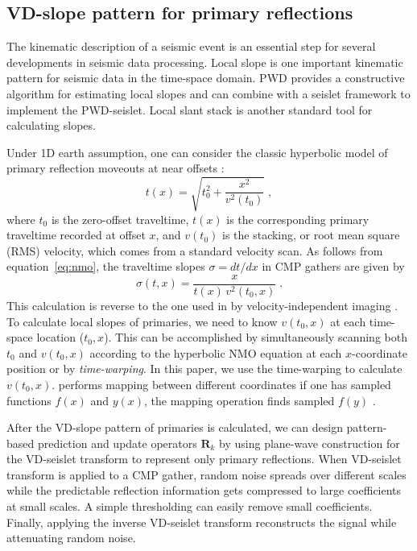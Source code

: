 \subsection{VD-slope pattern for primary reflections}
The kinematic description of a seismic event is an essential step for
several developments in seismic data processing. Local slope is
one important kinematic pattern for seismic data in the time-space
domain. PWD provides a constructive algorithm for estimating local slopes
\cite[]{Claerbout92,Fomel02,Schleicher09,Chen13a,Chen13b} and can 
combine with a seislet framework to implement the PWD-seislet. Local
slant stack \cite[]{Ottolini83} is another standard tool for
calculating slopes.

Under 1D earth assumption, one can consider the classic 
hyperbolic model of primary reflection moveouts at near offsets
\cite[]{Dix55}:
\begin{equation}
  \label{eq:nmo}
  t(x) = \sqrt{t_0^2 + \frac{x^2}{v^2(t_0)}}\;,
\end{equation}
where $t_0$ is the zero-offset traveltime, $t(x)$ is the corresponding
primary traveltime recorded at offset $x$, and $v(t_0)$ is the
stacking, or root mean square (RMS) velocity, which comes from a
standard velocity scan. As follows from equation~\ref{eq:nmo}, the
traveltime slopes $\sigma= dt/dx$ in CMP gathers are given by
\begin{equation}
  {\sigma(t,x)} = {\frac{x}{t(x)\,v^2(t_0,x)}}\;.
  \label{eq:pnmo}
\end{equation}
This calculation is reverse to the one used in   by
velocity-independent imaging \cite[]{Ottolini83b,Fomel07b}.  To
calculate local slopes of primaries, we need to know $v(t_0, x)$ at
each time-space location ($t_0,x$). This can be accomplished by
simultaneously scanning both $t_0$ and $v(t_0,x)$ according to the
hyperbolic NMO equation at each $x$-coordinate position or by
\emph{time-warping}. In this paper, we use the time-warping  to calculate
$v(t_0, x)$.   performs mapping between different
coordinates\old{,}\new{:} if one has sampled functions $f(x)$ and $y(x)$, the
mapping operation finds sampled $f(y)$ \cite[]{Burnett09,Casasanta11}.

After the VD-slope pattern of primaries is calculated, we can design
pattern-based prediction and update operators $\mathbf{R}_k$ by using
plane-wave construction for the VD-seislet transform to represent only
primary reflections. When VD-seislet transform is applied to a CMP
gather, random noise spreads over different scales while the
predictable reflection information gets compressed to large
coefficients at small scales. A simple thresholding   can easily
remove small coefficients. Finally, applying the inverse
VD-seislet transform reconstructs the signal while attenuating random
noise.

